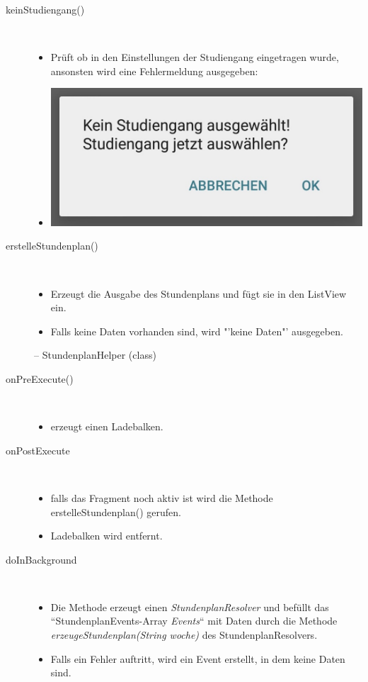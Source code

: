 \begin{description}
\item[keinStudiengang()]~\par
\begin{itemize}
\item Prüft ob in den Einstellungen der Studiengang eingetragen wurde, ansonsten wird eine Fehlermeldung ausgegeben:
\item[] \includegraphics[scale=0.5]{05_Handbuch/img/Studiengang.jpg}
\end{itemize}

\item[erstelleStundenplan()]~\par
\begin{itemize}
\item Erzeugt die Ausgabe des Stundenplans und fügt sie in den ListView ein.
\item Falls keine Daten vorhanden sind, wird "'keine Daten"' ausgegeben.
\end{itemize}
 
-- StundenplanHelper (class)
 
\item[onPreExecute()]~\par
\begin{itemize}
\item erzeugt einen Ladebalken.
\end{itemize}
\item[onPostExecute]~\par
\begin{itemize}
\item falls das Fragment noch aktiv ist wird die Methode erstelleStundenplan() gerufen.
\item Ladebalken wird entfernt.
\end{itemize}
 
\item[doInBackground]~\par
\begin{itemize}
\item Die Methode erzeugt einen \textit{StundenplanResolver} und
befüllt das “StundenplanEvents-Array \textit{Events}“ mit Daten durch die Methode \textit{erzeugeStundenplan(String woche)} des StundenplanResolvers.
\item Falls ein Fehler auftritt, wird ein Event erstellt, in dem keine Daten sind.
\end{itemize}


\end{description}
